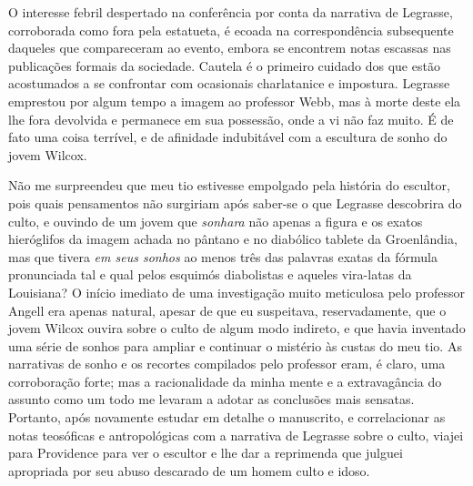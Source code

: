 \begin{pages}
\begin{Rightside}
O interesse febril despertado na conferência por conta da narrativa de
Legrasse, corroborada como fora pela estatueta, é ecoada na
correspondência subsequente daqueles que compareceram ao evento, embora
se encontrem notas escassas nas publicações formais da sociedade.
Cautela é o primeiro cuidado dos que estão acostumados a se confrontar
com ocasionais charlatanice e impostura. Legrasse emprestou por algum
tempo a imagem ao professor Webb, mas à morte deste ela lhe fora
devolvida e permanece em sua possessão, onde a vi não faz muito. É de
fato uma coisa terrível, e de afinidade indubitável com a escultura de
sonho do jovem Wilcox.

Não me surpreendeu que meu tio estivesse empolgado pela história do
escultor, pois quais pensamentos não surgiriam após saber-se o que
Legrasse descobrira do culto, e ouvindo de um jovem que \emph{sonhara}
não apenas a figura e os exatos hieróglifos da imagem achada no pântano
e no diabólico tablete da Groenlândia, mas que tivera \emph{em seus
sonhos} ao menos três das palavras exatas da fórmula pronunciada tal e
qual pelos esquimós diabolistas e aqueles vira-latas da Louisiana? O
início imediato de uma investigação muito meticulosa pelo professor
Angell era apenas natural, apesar de que eu suspeitava, reservadamente,
que o jovem Wilcox ouvira sobre o culto de algum modo indireto, e que
havia inventado uma série de sonhos para ampliar e continuar o mistério
às custas do meu tio. As narrativas de sonho e os recortes compilados
pelo professor eram, é claro, uma corroboração forte; mas a
racionalidade da minha mente e a extravagância do assunto como um todo
me levaram a adotar as conclusões mais sensatas. Portanto, após
novamente estudar em detalhe o manuscrito, e correlacionar as notas
teosóficas e antropológicas com a narrativa de Legrasse sobre o culto,
viajei para Providence para ver o escultor e lhe dar a reprimenda que
julguei apropriada por seu abuso descarado de um homem culto e idoso.


\end{Rightside}
\end{pages}
